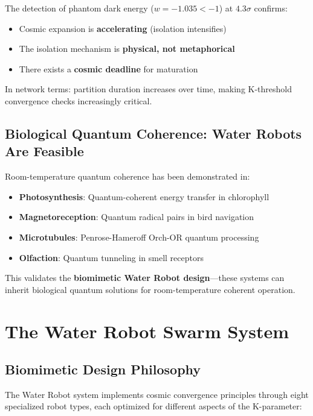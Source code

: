\documentclass[12pt,a4paper]{article}
\begin{document}
The detection of phantom dark energy ($w = -1.035 < -1$) at $4.3\sigma$ confirms:
\begin{itemize}
    \item Cosmic expansion is \textbf{accelerating} (isolation intensifies)
    \item The isolation mechanism is \textbf{physical, not metaphorical}
    \item There exists a \textbf{cosmic deadline} for maturation
\end{itemize}

In network terms: partition duration increases over time, making K-threshold
convergence checks increasingly critical.

\subsection{Biological Quantum Coherence: Water Robots Are Feasible}

Room-temperature quantum coherence has been demonstrated in:
\begin{itemize}
    \item \textbf{Photosynthesis}: Quantum-coherent energy transfer in chlorophyll
    \item \textbf{Magnetoreception}: Quantum radical pairs in bird navigation
    \item \textbf{Microtubules}: Penrose-Hameroff Orch-OR quantum processing
    \item \textbf{Olfaction}: Quantum tunneling in smell receptors
\end{itemize}

This validates the \textbf{biomimetic Water Robot design}---these systems can inherit
biological quantum solutions for room-temperature coherent operation.

\section{The Water Robot Swarm System}

\subsection{Biomimetic Design Philosophy}

The Water Robot system implements cosmic convergence principles through eight specialized
robot types, each optimized for different aspects of the K-parameter:
\end{document}
